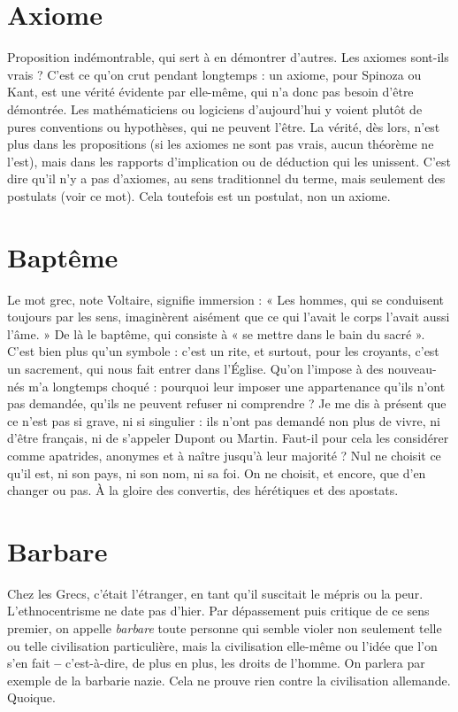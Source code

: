 \section{Axiome}
Proposition indémontrable, qui sert à en démontrer d’autres. Les
axiomes sont-ils vrais ? C’est ce qu’on crut pendant longtemps :
un axiome, pour Spinoza ou Kant, est une vérité évidente par elle-même, qui
n'a donc pas besoin d’être démontrée. Les mathématiciens ou logiciens
d’aujourd’hui y voient plutôt de pures conventions ou hypothèses, qui ne peuvent
l'être. La vérité, dès lors, n’est plus dans les propositions (si les axiomes ne
sont pas vrais, aucun théorème ne l’est), mais dans les rapports d’implication
ou de déduction qui les unissent. C’est dire qu’il n’y a pas d’axiomes, au sens
traditionnel du terme, mais seulement des postulats (voir ce mot). Cela toutefois
est un postulat, non un axiome.

\section{Baptême}
Le mot grec, note Voltaire, signifie immersion : « Les hommes,
qui se conduisent toujours par les sens, imaginèrent aisément que
ce qui l'avait le corps l'avait aussi l'âme. » De là le baptême, qui consiste à « se
mettre dans le bain du sacré ». C’est bien plus qu’un symbole : c’est un rite, et
surtout, pour les croyants, c’est un sacrement, qui nous fait entrer dans l’Église.
Qu'on l’impose à des nouveau-nés m’a longtemps choqué : pourquoi leur
imposer une appartenance qu’ils n’ont pas demandée, qu’ils ne peuvent refuser
ni comprendre ? Je me dis à présent que ce n’est pas si grave, ni si singulier : ils
n’ont pas demandé non plus de vivre, ni d’être français, ni de s'appeler Dupont
ou Martin. Faut-il pour cela les considérer comme apatrides, anonymes et à
naître jusqu’à leur majorité ? Nul ne choisit ce qu’il est, ni son pays, ni son
nom, ni sa foi. On ne choisit, et encore, que d’en changer ou pas. À la gloire
des convertis, des hérétiques et des apostats.

\section{Barbare}
Chez les Grecs, c'était l'étranger, en tant qu’il suscitait le mépris
ou la peur. L’ethnocentrisme ne date pas d’hier. Par dépassement
puis critique de ce sens premier, on appelle {\it barbare} toute personne qui semble
violer non seulement telle ou telle civilisation particulière, mais la civilisation
elle-même ou l’idée que l’on s’en fait {\bf --} c’est-à-dire, de plus en plus, les droits
de l’homme. On parlera par exemple de la barbarie nazie. Cela ne prouve rien
contre la civilisation allemande. Quoique.

